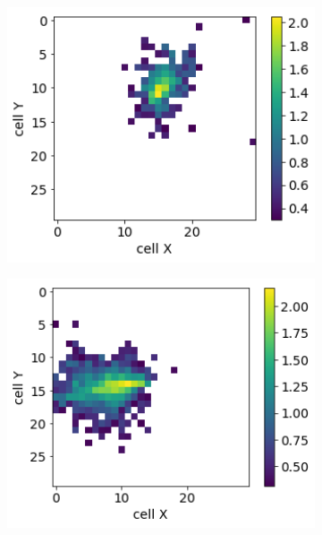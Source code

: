 \begin{figure}
\begin{subfigure}{0.24\textwidth}
    \includegraphics[width=1\textwidth]{figures/2_real.png}
  \end{subfigure}
    \begin{subfigure}{0.24\textwidth}
    \centering
    \includegraphics[width=1\textwidth]{figures/3_real.png}

\end{subfigure}
\end{figure}
